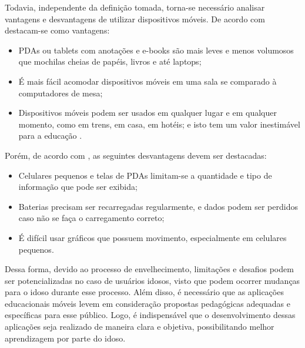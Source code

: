 Todavia, independente da definição tomada, torna-se necessário analisar vantagens e desvantagens de utilizar dispositivos móveis. De acordo com \cite{RICHAMEHTA2016} destacam-se como vantagens: 

\begin{itemize}
    \item PDAs ou tablets com anotações e e-books são mais leves e menos volumosos que mochilas cheias de papéis, livros e até laptops;
    \item É mais fácil acomodar dispositivos móveis em uma sala se comparado à computadores de mesa;
    \item Dispositivos móveis podem ser usados em qualquer lugar e em qualquer momento, como em trens, em casa, em hotéis; e isto tem um valor inestimável para a educação \citep{CarmaMaia2008}.
\end{itemize}


Porém, de acordo com \cite{RICHAMEHTA2016}, as seguintes desvantagens devem ser destacadas: 

\begin{itemize}
    \item Celulares pequenos e telas de PDAs limitam-se a quantidade e tipo de informação que pode ser exibida;
    \item Baterias precisam ser recarregadas regularmente, e dados podem ser perdidos caso não se faça o carregamento correto;
    \item É difícil usar gráficos que possuem movimento, especialmente em celulares pequenos.
\end{itemize}

Dessa forma, devido ao processo de envelhecimento, limitações e desafios podem ser potencializadas no caso de usuários idosos, visto que podem ocorrer mudanças para o idoso durante esse processo. Além disso, é necessário que as aplicações educacionais móveis levem em consideração propostas pedagógicas adequadas e específicas para esse público. Logo, é indispensável que o desenvolvimento dessas aplicações seja realizado de maneira clara e objetiva, possibilitando melhor aprendizagem por parte do idoso.


